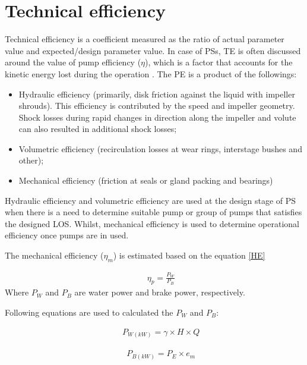 \section{Technical efficiency}
\label{32}
Technical efficiency is a coefficient measured as the ratio of actual parameter value and expected/design parameter value. In case of PSs, TE is often discussed around the value of pump efficiency ($\eta$), which is a factor that accounts for the kinetic energy lost during the operation \cite{Girdhar2005}. The PE is a product of the followings:

\begin{itemize}
	\item Hydraulic efficiency (primarily, disk friction against the liquid with impeller shrouds). This efficiency is contributed by the speed and impeller geometry. Shock losses during rapid changes in direction along the impeller and volute can also resulted in additional shock losses;
	\item Volumetric efficiency (recirculation losses at wear rings, interstage bushes and other);
	\item Mechanical efficiency (friction at seals or gland packing and bearings)
\end{itemize}

Hydraulic efficiency and volumetric efficiency are used at the design stage of PS when there is a need to determine suitable pump or group of pumps that satisfies the designed LOS. Whilst, mechanical efficiency is used to determine operational efficiency once pumps are in used.

The mechanical efficiency ($\eta_m$) is estimated based on the equation \ref{HE}

\begin{eqnarray}
&& \eta_p = \frac{P_W}{P_B} \label{HE}
\end{eqnarray}
Where $P_W$ and $P_B$ are water power and brake power, respectively. 

Following equations are used to calculated the $P_W$ and $P_B$:

\begin{eqnarray}
&& P_{W(kW)} = \gamma \times H \times Q \label{PW}
\end{eqnarray}

\begin{eqnarray}
&& P_{B(kW)} = P_E \times e_m \label{PB}
\end{eqnarray}




